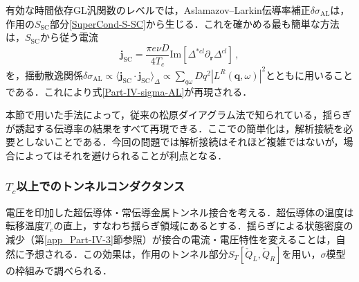 \documentclass[a4paper,11pt]{ltjsarticle}
\def\qo{(\mathbf{q},\omega)}
\begin{document}
有効な時間依存GL汎関数のレベルでは，Aslamazov--Larkin伝導率補正$\delta\sigma_{\mathrm{AL}}$は，作用の$S_{\mathrm{SC}}$部分\eqref{SuperCond-S-SC}から生じる．これを確かめる最も簡単な方法は，$S_{\mathrm{SC}}$から従う電流
$$\mathbf{j}_{\mathrm{SC}}=\frac{\pi e\nu
D}{4T_{c}}\mathrm{Im}[\Delta^{*cl}\partial_{\mathbf{r}}\Delta^{cl}]\,,$$
を，揺動散逸関係$\delta\sigma_{\mathrm{AL}}\propto\big\langle\mathbf{j}_{\mathrm{SC}}\cdot\mathbf{j}_{\mathrm{SC}}\big\rangle_{\Delta}\propto\sum_{q\omega}Dq^2|L^{R}\qo|^2$とともに用いることである．これにより式\eqref{Part-IV-sigma-AL}が再現される．

本節で用いた手法によって，従来の松原ダイアグラム法で知られている，揺らぎが誘起する伝導率の結果をすべて再現できる．ここでの簡単化は，解析接続を必要としないことである．今回の問題では解析接続はそれほど複雑ではないが，場合によってはそれを避けられることが利点となる．

\subsubsection{$T_c$以上でのトンネルコンダクタンス}\label{app_Part-IV-5}

電圧を印加した超伝導体・常伝導金属トンネル接合を考える．超伝導体の温度は転移温度$T_c$の直上，すなわち揺らぎ領域にあるとする．揺らぎによる状態密度の減少（第\ref{app_Part-IV-3}節参照）が接合の電流・電圧特性を変えることは，自然に予想される\cite{VarlamovDorin,DiCastro,Reizer}．この効果は，作用のトンネル部分$S_{T}[\check{Q}_{L},\check{Q}_{R}]$を用い，$\sigma$模型の枠組みで調べられる．
\end{document}
